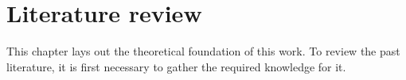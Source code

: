 \chapter{Literature review}
This chapter lays out the theoretical foundation of this work.
To review the past literature, it is first necessary to gather the required knowledge for it.



